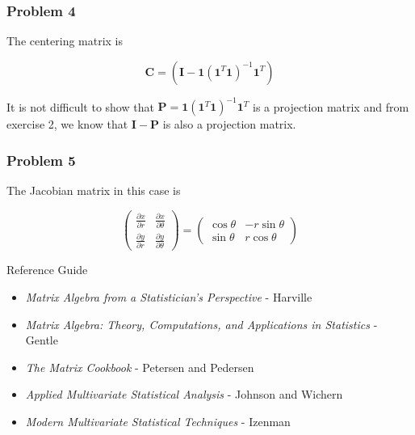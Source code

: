 \documentclass{beamer}
\begin{document}
\begin{frame}
\frametitle{Problem 4}
The centering matrix is 

$$\mathbf{C} = (\mathbf{I} - \mathbf{1}(\mathbf{1}^T \mathbf{1})^{-1} \mathbf{1}^T)$$

It is not difficult to show that $\mathbf{P} = \mathbf{1}(\mathbf{1}^T \mathbf{1})^{-1} \mathbf{1}^T$ is a projection matrix and from exercise 2, we know that $\mathbf{I} - \mathbf{P}$ is also a projection matrix.
\end{frame}

\begin{frame}
\frametitle{Problem 5}
The Jacobian matrix in this case is

$$\begin{pmatrix} \frac{\partial x}{\partial r} & \frac{\partial x}{\partial \theta} \\ \frac{\partial y}{\partial r} & \frac{\partial y}{\partial \theta}\end{pmatrix} = \begin{pmatrix} \cos \theta & -r \sin \theta \\ \sin \theta & r \cos \theta \end{pmatrix}$$
\end{frame}




\begin{frame}{Reference Guide}
\begin{itemize}
\item{\emph{Matrix Algebra from a Statistician's Perspective} - Harville}
\item{\emph{Matrix Algebra: Theory, Computations, and Applications in Statistics} - Gentle}
\item{\emph{The Matrix Cookbook} - Petersen and Pedersen}
\item{\emph{Applied Multivariate Statistical Analysis} - Johnson and Wichern}
\item{\emph{Modern Multivariate Statistical Techniques} - Izenman}
\end{itemize}
\end{frame}
\end{document}
